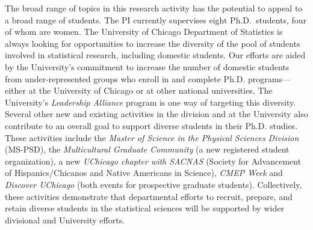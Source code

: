 The broad range of topics in this research activity has the potential
to appeal to a broad range of students.  The PI currently supervises
eight Ph.D.~students, four of whom are women.  The University of Chicago
Department of Statistics is always looking for opportunities to
increase the diversity of the pool of students involved in statistical
research, including domestic students.  Our efforts
are aided by the 
University's commitment to increase the number of domestic students
from under-represented groups who enroll in and complete
Ph.D. programs---either at the University of Chicago or at other
national universities.  The University's \textit{Leadership Alliance}
program is one way of targeting this diversity.  Several other new and
existing activities in the division and at the University also
contribute to an overall goal to support diverse students in their
Ph.D. studies. These activities include the \textit{Master of Science
  in the Physical Sciences Division} (MS-PSD), the
\textit{Multicultural Graduate Community} (a new registered student
organization), a new \textit{UChicago chapter with SACNAS} (Society
for Advancement of Hispanics/Chicanos and Native Americans in
Science), \textit{CMEP Week} and \textit{Discover UChicago} (both
events for prospective graduate students).  Collectively, these
activities demonstrate that departmental efforts to recruit, prepare,
and retain diverse students in the statistical sciences will be
supported by wider divisional and University efforts.









